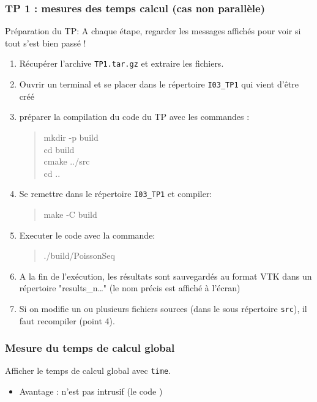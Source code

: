 \documentclass{beamer}
\begin{document}
\begin{frame}
	\frametitle{TP 1 : mesures des temps calcul (cas non parall\`ele)}
	
	Pr\'eparation du TP:
	\vfill
	A chaque \'etape, regarder les messages affich\'es pour voir si tout s'est bien pass\'e !
	\begin{enumerate}
		\item R\'ecup\'erer l'archive {\tt TP1.tar.gz} et extraire les fichiers.
		\item Ouvrir un terminal et se placer dans le r\'epertoire {\tt I03\_TP1} qui vient d'\^etre cr\'e\'e
		\item préparer la compilation du code du TP avec les commandes :
		\begin{quote}
			mkdir -p build\\
			cd build\\
			cmake ../src\\
			cd ..
		\end{quote}
		\item Se remettre dans le r\'epertoire {\tt I03\_TP1} et compiler:
		\begin{quote}
			make -C build
		\end{quote}
	\end{enumerate}
	
\end{frame}
\begin{frame}
	\begin{enumerate}
  		\setcounter{enumi}{4}
		\item Executer le code avec la commande:
		\begin{quote}
			./build/PoissonSeq
		\end{quote}
		\item A la fin de l'exécution, les résultats sont sauvegardés au format VTK dans un répertoire "results\_n\ldots" (le nom précis est affiché à l'écran)

		\item Si on modifie un ou plusieurs fichiers sources (dans le sous r\'epertoire {\tt 	src}), il faut recompiler (point 4).
	\end{enumerate}
\end{frame}
\begin{frame}
	\frametitle{Mesure du temps de calcul global}
	Afficher le temps de calcul global avec {\tt time}.
	
	\begin{itemize}
		\item Avantage : n'est pas intrusif (le code )
	\end{itemize}
\end{frame}
	
\end{document}
